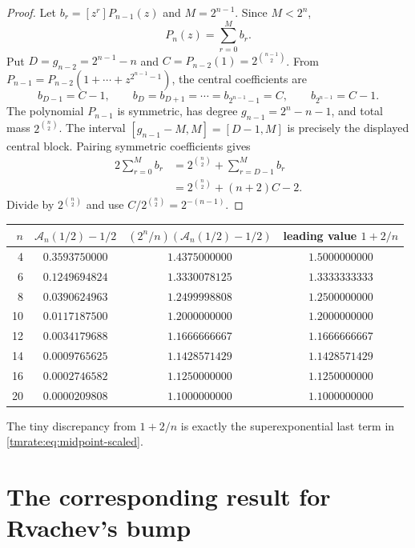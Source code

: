 \documentclass[11pt,oneside]{article}
\theoremstyle{definition}
\theoremstyle{remark}
\begin{document}
\begin{proof}
Let $b_r=[z^r]P_{n-1}(z)$ and $M=2^{n-1}$.  Since $M<2^n$,
\begin{equation*}
 [z^M]P_n(z)=\sum_{r=0}^{M}b_r.
\end{equation*}
Put $D=g_{n-2}=2^{n-1}-n$ and
$C=P_{n-2}(1)=2^{\binom{n-1}{2}}$.  From
$P_{n-1}=P_{n-2}(1+\cdots+z^{2^{n-1}-1})$, the central coefficients are
\begin{equation*}
 b_{D-1}=C-1,
 \qquad b_D=b_{D+1}=\cdots=b_{2^{n-1}-1}=C,
 \qquad b_{2^{n-1}}=C-1.
\end{equation*}
The polynomial $P_{n-1}$ is symmetric, has degree
$g_{n-1}=2^n-n-1$, and total mass $2^{\binom n2}$.  The interval
$[g_{n-1}-M,M]=[D-1,M]$ is precisely the displayed central block.  Pairing
symmetric coefficients gives
\begin{align*}
 2\sum_{r=0}^{M}b_r
 &=2^{\binom n2}+\sum_{r=D-1}^{M}b_r\\
 &=2^{\binom n2}+(n+2)C-2.
\end{align*}
Divide by $2^{\binom n2}$ and use
$C/2^{\binom n2}=2^{-(n-1)}$.
\end{proof}

\begin{center}
\begin{tabular}{@{}rccc@{}}
\toprule
$n$ & $\mathcal A_n(1/2)-1/2$ & $(2^n/n)(\mathcal A_n(1/2)-1/2)$ & leading value $1+2/n$\\
\midrule
4  & $0.3593750000$ & $1.4375000000$ & $1.5000000000$\\
6  & $0.1249694824$ & $1.3330078125$ & $1.3333333333$\\
8  & $0.0390624963$ & $1.2499998808$ & $1.2500000000$\\
10 & $0.0117187500$ & $1.2000000000$ & $1.2000000000$\\
12 & $0.0034179688$ & $1.1666666667$ & $1.1666666667$\\
14 & $0.0009765625$ & $1.1428571429$ & $1.1428571429$\\
16 & $0.0002746582$ & $1.1250000000$ & $1.1250000000$\\
20 & $0.0000209808$ & $1.1000000000$ & $1.1000000000$\\
\bottomrule
\end{tabular}
\end{center}
The tiny discrepancy from $1+2/n$ is exactly the superexponential last term in
\eqref{tmrate:eq:midpoint-scaled}.

\section{The corresponding result for Rvachev's bump}
\label{tmrate:sec:up-rate}
\end{document}
